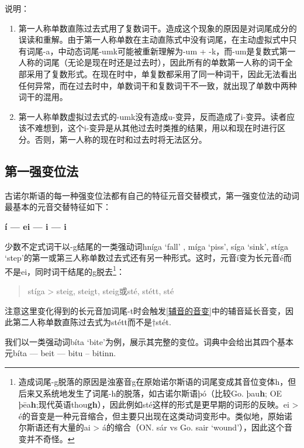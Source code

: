 说明：

\begin{enumerate}
    \item
          \label{_Ref117719619}{}第一人称单数直陈过去式用了复数词干。造成这个现象的原因是对词尾成分的误读和重解。由于第一人称单数在主动直陈式中没有词尾，在主动虚拟式中只有词尾-a，中动态词尾-umk可能被重新理解为-um + -k，而-um是复数式第一人称的词尾（无论是现在时还是过去时），因此所有的单数第一人称的词干全部采用了复数形式。在现在时中，单复数都采用了同一种词干，因此无法看出任何异常，而在过去时中，单数词干和复数词干不一致，就出现了单数中两种词干的混用。
    \item
          第一人称单数虚拟过去式的-umk没有造成u-变异，反而造成了i-变异。读者应该不难想到，这个i-变异是从其他过去时类推的结果，用以和现在时进行区分。否则，第一人称的现在时和过去时将无法区分。
\end{enumerate}

\subsection{第一强变位法}\label{第一强变位法}

古诺尔斯语的每一种强变位法都有自己的特征元音交替模式，第一强变位法的动词最基本的元音交替特征如下：

\begin{center}
    \textbf{í --- ei --- i --- i}
\end{center}


少数不定式词干以-g结尾的一类强动词hníga `fall' , míga `piss', síga
`sink', stíga `step'的第一或第三人称单数过去式还有另一种形式。这时，元音í变为长元音é而不是ei，同时词干结尾的g脱去\footnote{造成词尾-g脱落的原因是浊塞音g在原始诺尔斯语的词尾变成其音位变体h，但后来又系统地发生了词尾-h的脱落，如古诺尔斯语þó（比较Go. þau\textbf{h}; OE þēa\textbf{h};现代英语thou\textbf{gh}），因此例如sté这样的形式是更早期的词形的反映。ei > é的音变是一种元音缩合，但主要只出现在这类动词变形中。类似地，原始诺尔斯语还有大量的ai > á的缩合（ON. sár vs Go. sair `wound'），因此这个音变并不奇怪。}：

\begin{quote}
    stíga > steig, steigt, steig或sté, stétt, sté
\end{quote}

注意这里变化得到的长元音加词尾-t时会触发\ref{辅音的音变}中的辅音延长音变，因此第二人称单数直陈过去式为stétt而不是†stét.

我们以一类强动词bíta
`bite'为例，展示其完整的变位。词典中会给出其四个基本元bíta --- beit
--- bitu -- bitinn.

